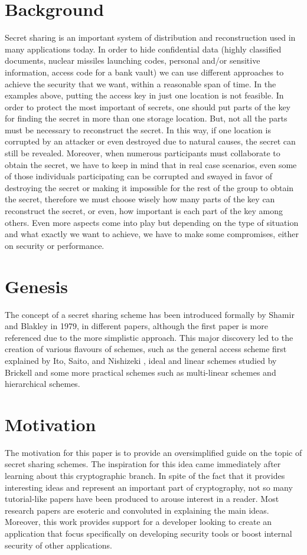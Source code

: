 \documentclass[12pt, a4paper, oneside]{book}
\begin{document}
    \section{Background} 
    Secret sharing is an important system of distribution and reconstruction used in many applications today. In order to hide confidential data (highly classified documents, nuclear missiles launching codes, personal and/or sensitive information, access code for a bank vault) we can use different approaches to achieve the security that we want, within a reasonable span of time. In the examples above, putting the access key in just one location is not feasible. In order to protect the most important of secrets, one should put parts of the key for finding the secret in more than one storage location. But, not all the parts must be necessary to reconstruct the secret. In this way, if one location is corrupted by an attacker or even destroyed due to natural causes, the secret can still be revealed. Moreover, when numerous participants must collaborate to obtain the secret, we have to keep in mind that in real case scenarios, even some of those individuals participating can be corrupted and swayed in favor of destroying the secret or making it impossible for the rest of the group to obtain the secret, therefore we must choose wisely how many parts of the key can reconstruct the secret, or even, how important is each part of the key among others. Even more aspects come into play but depending on the type of situation and what exactly we want to achieve, we have to make some compromises, either on security or performance.
    \section{Genesis} 
    The concept of a secret sharing scheme has been introduced formally by Shamir \cite{ShareASecret} and Blakley \cite{ShareASecret_Blackley} in 1979, in different papers, although the first paper is more referenced due to the more simplistic approach. This major discovery led to the creation of various flavours of schemes, such as the general access scheme first explained by Ito, Saito, and Nishizeki \cite{GeneralSSS}, ideal and linear schemes studied by Brickell \cite{IdealSSS} and some more practical schemes such as multi-linear schemes and hierarchical schemes. 
    \section{Motivation}
    The motivation for this paper is to provide an oversimplified guide on the topic of secret sharing schemes. The inspiration for this idea came immediately after learning about this cryptographic branch. In spite of the fact that it provides interesting ideas and represent an important part of cryptography, not so many tutorial-like papers have been produced to arouse interest in a reader. Most research papers are esoteric and convoluted in explaining the main ideas. Moreover, this work provides support for a developer looking to create an application that focus specifically on developing security tools or boost internal security of other applications.
\end{document}
